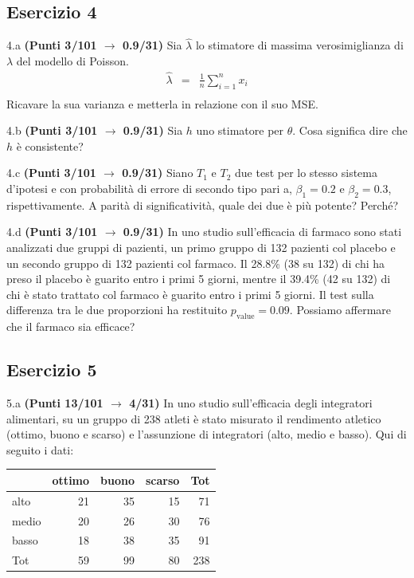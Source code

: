 \documentclass[
  11pt,
]{book}
\theoremstyle{mytheoremstyle}
\theoremstyle{mydefstyle}
\begin{document}
\subsection{Esercizio 4}\label{esercizio-4-21}

4.a \textbf{(Punti 3/101 \(\rightarrow\) 0.9/31)} Sia \(\hat \lambda\) lo stimatore di massima verosimiglianza di \(\lambda\) del modello di Poisson.
\begin{eqnarray*}
  \hat\lambda &=&  \frac 1n\sum_{i=1}^nx_i\\
\end{eqnarray*}
Ricavare la sua varianza e metterla in relazione con il suo MSE.

4.b \textbf{(Punti 3/101 \(\rightarrow\) 0.9/31)} Sia \(h\) uno stimatore per \(\theta\). Cosa significa dire che \(h\) è consistente?

4.c \textbf{(Punti 3/101 \(\rightarrow\) 0.9/31)} Siano \(T_1\) e \(T_2\) due test per lo stesso sistema d'ipotesi e con probabilità di errore di secondo tipo pari a, \(\beta_1=0.2\) e \(\beta_2=0.3\), rispettivamente. A parità di significatività, quale dei due è più potente? Perché?

4.d \textbf{(Punti 3/101 \(\rightarrow\) 0.9/31)} In uno studio sull'efficacia di farmaco sono stati analizzati due gruppi di pazienti, un primo gruppo di 132 pazienti col placebo e un secondo gruppo di 132 pazienti col farmaco. Il 28.8\% (38 su 132) di chi ha preso il placebo è guarito entro i primi 5 giorni, mentre il 39.4\% (42 su 132) di chi è stato trattato col farmaco è guarito entro i primi 5 giorni. Il test sulla differenza tra le due proporzioni ha restituito \(p_\text{value}=0.09\). Possiamo affermare che il farmaco sia efficace?

\subsection{Esercizio 5}\label{esercizio-5-20}

5.a \textbf{(Punti 13/101 \(\rightarrow\) 4/31)} In uno studio sull'efficacia degli integratori alimentari, su un gruppo di 238 atleti è stato misurato il rendimento atletico (ottimo, buono e scarso) e l'assunzione di integratori (alto, medio e basso). Qui di seguito i dati:

\begin{table}[H]
\centering
\begin{tabular}{lrrrr}
\toprule
  & ottimo & buono & scarso & Tot\\
\midrule
alto & 21 & 35 & 15 & 71\\
medio & 20 & 26 & 30 & 76\\
basso & 18 & 38 & 35 & 91\\
Tot & 59 & 99 & 80 & 238\\
\bottomrule
\end{tabular}
\end{table}
\end{document}
